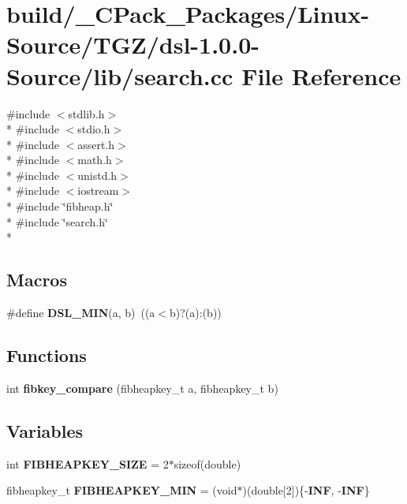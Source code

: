 \section{build/\-\_\-\-C\-Pack\-\_\-\-Packages/\-Linux-\/\-Source/\-T\-G\-Z/dsl-\/1.0.0-\/\-Source/lib/search.cc File Reference}
\label{build_2__CPack__Packages_2Linux-Source_2TGZ_2dsl-1_80_80-Source_2lib_2search_8cc}
{\ttfamily \#include $<$stdlib.\-h$>$}\\*
{\ttfamily \#include $<$stdio.\-h$>$}\\*
{\ttfamily \#include $<$assert.\-h$>$}\\*
{\ttfamily \#include $<$math.\-h$>$}\\*
{\ttfamily \#include $<$unistd.\-h$>$}\\*
{\ttfamily \#include $<$iostream$>$}\\*
{\ttfamily \#include \char`\"{}fibheap.\-h\char`\"{}}\\*
{\ttfamily \#include \char`\"{}search.\-h\char`\"{}}\\*
\subsection*{Macros}
\begin{DoxyCompactItemize}
\item 
\#define {\bf D\-S\-L\-\_\-\-M\-I\-N}(a, b)~((a$<$b)?(a)\-:(b))
\end{DoxyCompactItemize}
\subsection*{Functions}
\begin{DoxyCompactItemize}
\item 
int {\bf fibkey\-\_\-compare} (fibheapkey\-\_\-t a, fibheapkey\-\_\-t b)
\end{DoxyCompactItemize}
\subsection*{Variables}
\begin{DoxyCompactItemize}
\item 
int {\bf F\-I\-B\-H\-E\-A\-P\-K\-E\-Y\-\_\-\-S\-I\-Z\-E} = 2$\ast$sizeof(double)
\item 
fibheapkey\-\_\-t {\bf F\-I\-B\-H\-E\-A\-P\-K\-E\-Y\-\_\-\-M\-I\-N} = (void$\ast$)(double[2])\{-\/{\bf I\-N\-F}, -\/{\bf I\-N\-F}\}
\end{DoxyCompactItemize}



